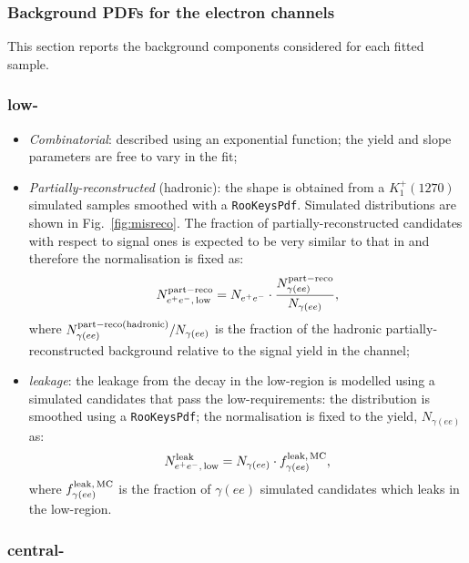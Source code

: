 \subsubsection{Background PDFs for the electron channels}
\label{sec:RKst_misreco_fit}

This section reports the background components considered for each fitted sample.

\subsubsection*{\BdToKstee low-\qsq}

\begin{itemize}

\item \textit{Combinatorial}: described using an exponential function; the yield and slope parameters are free to vary in the fit;

\item \textit{Partially-reconstructed} (hadronic): the shape is obtained from a $K_1^+(1270)$ simulated samples smoothed with
a \verb!RooKeysPdf!. Simulated distributions are shown in Fig.~\ref{fig:misreco}. The fraction of partially-reconstructed 
candidates with respect to signal ones is expected to be very similar to that
in \BdToKstGee and therefore the normalisation is fixed as:
%
$$N_{e^+ e^-, \, {\rm low}}^{\rm part-reco} = N_{e^+ e^-} \cdot \frac{N_{\gamma(ee)}^{\rm part-reco}}{N_{\gamma(ee)}},$$
%
where $N_{\gamma(ee)}^{\rm part-reco (hadronic)}/N_{\gamma(ee)}$ is the fraction of the hadronic partially-reconstructed background relative to the signal yield in the \BdToKstGee channel;

\item \textit{\BdToKstG leakage}: the leakage from the \BdToKstGee decay in the low-\qsq region is modelled using a simulated candidates that pass the low-\qsq requirements: the distribution is smoothed using a \verb!RooKeysPdf!; the normalisation is fixed to the \BdToKstGee yield, $N_{\gamma(ee)}$ as:
%
$$N_{e^+ e^-, \, {\rm low}}^{\rm leak} = N_{\gamma(ee)} \cdot f_{\gamma(ee)}^{\rm leak, \,MC},$$
%
where $f_{\gamma(ee)}^{\rm leak, \,MC}$ is the fraction of $\gamma(ee)$ simulated candidates which leaks in the low-\qsq region.

\end{itemize}


\subsubsection*{\BdToKstee central-\qsq}

